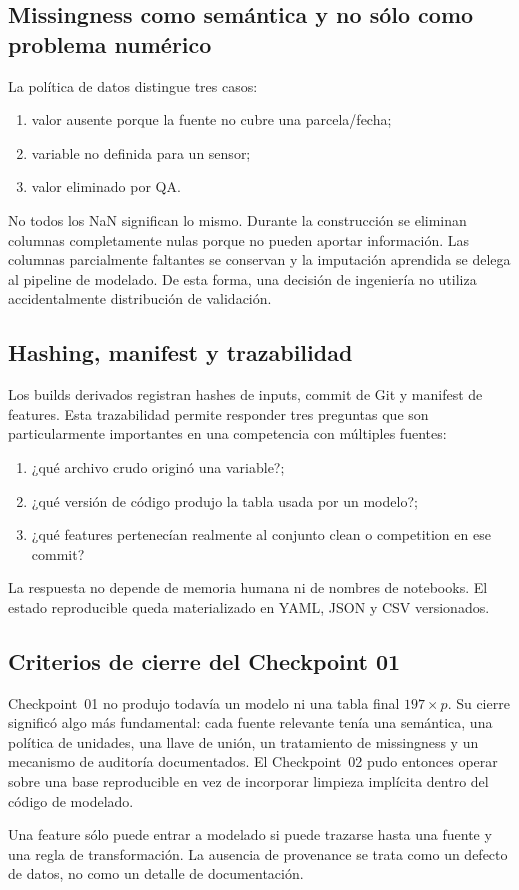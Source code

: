 \subsection{Missingness como semántica y no sólo como problema numérico}

La política de datos distingue tres casos:
\begin{enumerate}
\item valor ausente porque la fuente no cubre una parcela/fecha;
\item variable no definida para un sensor;
\item valor eliminado por QA.
\end{enumerate}
No todos los NaN significan lo mismo. Durante la construcción se eliminan columnas
completamente nulas porque no pueden aportar información. Las columnas parcialmente faltantes
se conservan y la imputación aprendida se delega al pipeline de modelado. De esta forma, una
decisión de ingeniería no utiliza accidentalmente distribución de validación.

\subsection{Hashing, manifest y trazabilidad}

Los builds derivados registran hashes de inputs, commit de Git y manifest de features. Esta
trazabilidad permite responder tres preguntas que son particularmente importantes en una
competencia con múltiples fuentes:
\begin{enumerate}
\item ¿qué archivo crudo originó una variable?;
\item ¿qué versión de código produjo la tabla usada por un modelo?;
\item ¿qué features pertenecían realmente al conjunto clean o competition en ese commit?
\end{enumerate}

La respuesta no depende de memoria humana ni de nombres de notebooks. El estado reproducible
queda materializado en YAML, JSON y CSV versionados.

\subsection{Criterios de cierre del Checkpoint 01}

Checkpoint~01 no produjo todavía un modelo ni una tabla final $197\times p$. Su cierre
significó algo más fundamental: cada fuente relevante tenía una semántica, una política de
unidades, una llave de unión, un tratamiento de missingness y un mecanismo de auditoría
documentados. El Checkpoint~02 pudo entonces operar sobre una base reproducible en vez de
incorporar limpieza implícita dentro del código de modelado.

\begin{decision}
Una feature sólo puede entrar a modelado si puede trazarse hasta una fuente y una regla de
transformación. La ausencia de provenance se trata como un defecto de datos, no como un
detalle de documentación.
\end{decision}
